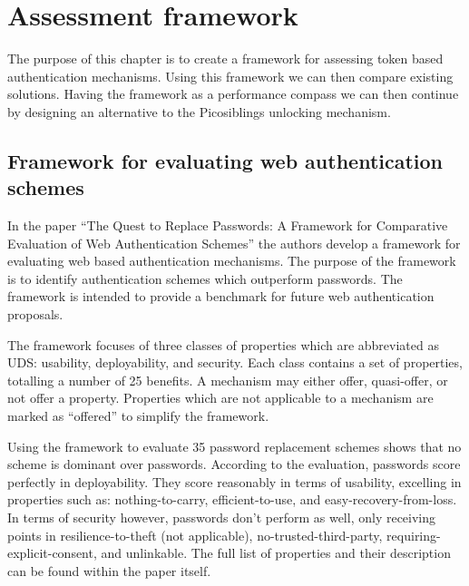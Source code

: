 
\chapter{Assessment framework}

\label{Chapter3}


The purpose of this chapter is to create a framework for assessing token based authentication mechanisms. Using this framework we can then compare existing solutions. Having the framework as a performance compass we can then continue by designing an alternative to the Picosiblings unlocking mechanism.

\section{Framework for evaluating web authentication schemes}

In the paper ``The Quest to Replace Passwords: A Framework for Comparative Evaluation of Web Authentication Schemes'' \cite{bonneau2012quest} the authors develop a framework for evaluating web based authentication mechanisms. The purpose of the framework is to identify authentication schemes which outperform passwords. The framework is intended to provide a benchmark for future web authentication proposals.

The framework focuses of three classes of properties which are abbreviated as UDS: usability, deployability, and security. Each class contains a set of properties, totalling a number of 25 benefits. A mechanism may either offer, quasi-offer, or not offer a property. Properties which are not applicable to a mechanism are marked as ``offered'' to simplify the framework.

Using the framework to evaluate 35 password replacement schemes shows that no scheme is dominant over passwords. According to the evaluation, passwords score perfectly in deployability. They score reasonably in terms of usability, excelling in properties such as: nothing-to-carry, efficient-to-use, and easy-recovery-from-loss. In terms of security however, passwords don't perform as well, only receiving points in resilience-to-theft (not applicable), no-trusted-third-party, requiring-explicit-consent, and unlinkable. The full list of properties and their description can be found within the paper itself.

